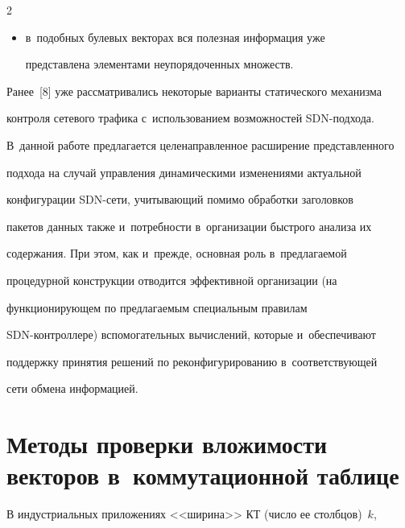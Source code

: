 \begin{multicols}{2}
\begin{itemize}
чем единиц;


\item в~подобных булевых векторах вся полезная информация уже 


представлена элементами неупорядоченных множеств.


\end{itemize}





  Ранее~[8] уже рассматривались некоторые варианты статического механизма 


контроля сетевого трафика с~использованием возможностей SDN-под\-хо\-да. 


В~данной работе предлагается целенаправлен\-ное расширение представленного 


подхода на случай управления динамическими изменениями актуальной 


конфигурации SDN-се\-ти, учи\-ты\-ва\-ющий помимо обработки заголовков 


пакетов данных также и~потребности в~организации быстрого анализа их 


содержания. При этом, как и~прежде, основная роль в~предлагаемой 


процедурной конструкции отводится эффективной организации (на 


функционирующем по предлагаемым специальным правилам  


SDN-конт\-рол\-ле\-ре) вспомогательных вычислений, которые и~обеспечивают 


поддержку принятия решений по реконфигурированию в~со\-от\-вет\-ст\-ву\-ющей 


сети обмена информацией.





\vspace*{-6pt}





\section{Методы проверки вложимости векторов в~коммутационной таблице}





\vspace*{-2pt}


  


  В индустриальных приложениях <<ширина>> КТ (число ее столбцов)~$k$, 



\end{multicols}
